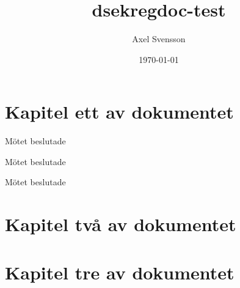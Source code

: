 \documentclass{dsekregdoc}
\date{\today}
\title{\textsf{dsekregdoc}-test}
\author{Axel Svensson}
\begin{document}
\section{Kapitel ett av dokumentet}
\begin{regsection}
  \lipsum[1]

Mötet beslutade
\begin{attlist}
\item \lipsum[4][1]
\item \lipsum[4][2]
\end{attlist}

\lipsum[2]

Mötet beslutade
\begin{attlist}
\item \lipsum[4][3]
\item \lipsum[4][4]
\end{attlist}

\lipsum[3]

\begin{samepage}
Mötet beslutade
\begin{attlist}
\item \lipsum[4][5]
\item \lipsum[4][6]
\end{attlist}
\end{samepage}

\end{regsection}
\section{Kapitel två av dokumentet}
\begin{regsection}
\lipsum[5-6]
\end{regsection}
\section{Kapitel tre av dokumentet}
\lipsum[7-8]
\end{document}
